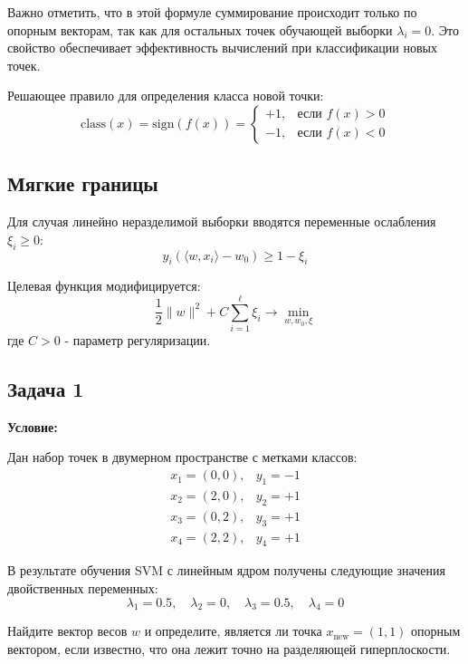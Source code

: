 \par Важно отметить, что в этой формуле суммирование происходит только по опорным векторам, так как для остальных точек обучающей выборки \(\lambda_i = 0\). Это свойство обеспечивает эффективность вычислений при классификации новых точек.

\par Решающее правило для определения класса новой точки:
\begin{equation*}
    \text{class}(x) = \text{sign}(f(x)) = 
    \begin{cases}
        +1, & \text{если } f(x) > 0 \\
        -1, & \text{если } f(x) < 0
    \end{cases}
\end{equation*}

\subsection{Мягкие границы}
\par Для случая линейно неразделимой выборки вводятся переменные ослабления \( \xi_i \geq 0 \):
\begin{equation*}
    y_i(\langle w,x_i \rangle - w_0) \geq 1 - \xi_i
\end{equation*}
\par Целевая функция модифицируется:
\begin{equation*}
    \frac{1}{2}\|w\|^2 + C\sum_{i=1}^{\ell} \xi_i \to \min_{w,w_0,\xi}
\end{equation*}
где \( C > 0 \) - параметр регуляризации.

\subsection{Задача 1}
\textbf{Условие:} 
\par Дан набор точек в двумерном пространстве с метками классов:
\begin{equation*}
    \begin{array}{ll}
        x_1 = (0,0), & y_1 = -1 \\
        x_2 = (2,0), & y_2 = +1 \\
        x_3 = (0,2), & y_3 = +1 \\
        x_4 = (2,2), & y_4 = +1
    \end{array}
\end{equation*}
\par В результате обучения SVM с линейным ядром получены следующие значения двойственных переменных:
\begin{equation*}
    \lambda_1 = 0.5, \quad \lambda_2 = 0, \quad \lambda_3 = 0.5, \quad \lambda_4 = 0
\end{equation*}
\par Найдите вектор весов \(w\) и определите, является ли точка \(x_{\text{new}} = (1,1)\) опорным вектором, если известно, что она лежит точно на разделяющей гиперплоскости.

